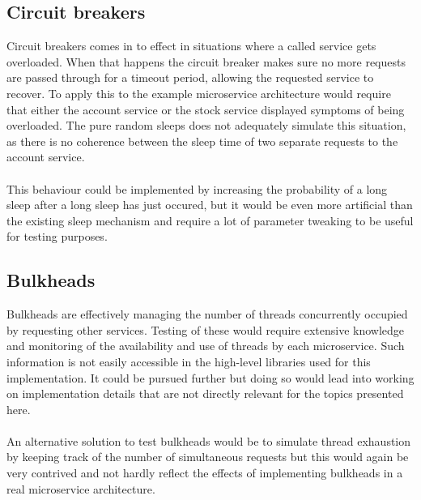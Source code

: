 \subsection{Circuit breakers}
Circuit breakers comes in to effect in situations where a called
service gets overloaded. When that happens the circuit breaker makes
sure no more requests are passed through for a timeout period,
allowing the requested service to recover. To apply this to the
example microservice architecture would require that either the
account service or the stock service displayed symptoms of being
overloaded. The pure random sleeps does not adequately simulate this
situation, as there is no coherence between the sleep time of two
separate requests to the account service.
\\\\
This behaviour could be implemented by increasing the probability of a
long sleep after a long sleep has just occured, but it would be even
more artificial than the existing sleep mechanism and require a lot of
parameter tweaking to be useful for testing purposes.

\subsection{Bulkheads}
Bulkheads are effectively managing the number of threads concurrently
occupied by requesting other services. Testing of these would require
extensive knowledge and monitoring of the availability and use of
threads by each microservice. Such information is not easily
accessible in the high-level libraries used for this
implementation. It could be pursued further but doing so would lead
into working on implementation details that are not directly relevant
for the topics presented here.
\\\\
An alternative solution to test bulkheads would be to simulate thread
exhaustion by keeping track of the number of simultaneous requests but
this would again be very contrived and not hardly reflect the effects
of implementing bulkheads in a real microservice architecture.
